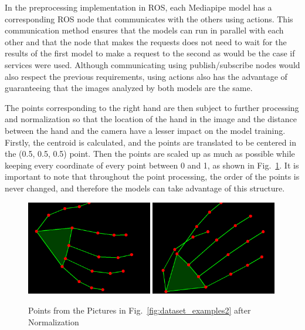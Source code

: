 In the preprocessing implementation in ROS, each Mediapipe model has a corresponding ROS node that communicates with the others using actions. This communication method ensures that the models can run in parallel with each other and that the node that makes the requests does not need to wait for the results of the first model to make a request to the second as would be the case if services were used. Although communicating using publish/subscribe nodes would also respect the previous requirements, using actions also has the advantage of guaranteeing that the images analyzed by both models are the same.

The points corresponding to the right hand are then subject to further processing and normalization so that the location of the hand in the image and the distance between the hand and the camera have a lesser impact on the model training. Firstly, the centroid is calculated, and the points are translated to be centered in the (0.5, 0.5, 0.5) point. Then the points are scaled up as much as possible while keeping every coordinate of every point between 0 and 1, as shown in Fig.~\ref{fig:dataset_examples3}. It is important to note that throughout the point processing, the order of the points is never changed, and therefore the models can take advantage of this structure.

\begin{figure}[H]
    \centerline{\includegraphics[width=0.49\textwidth]{figs/dataset_preprocessing3_1.png} \includegraphics[width=0.49\textwidth]{figs/dataset_preprocessing3_2.png}}
    \caption[Points from the Pictures in Fig.~\ref{fig:dataset_examples2} after Normalization]{Points from the Pictures in Fig.~\ref{fig:dataset_examples2} after Normalization}
    \label{fig:dataset_examples3}
\end{figure}

